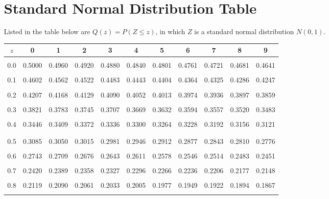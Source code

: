 \documentclass{report}
\begin{document}
\appendix

\chapter{Standard Normal Distribution Table}

Listed in the table below are $Q(z) = P(Z \leq z)$, in which $Z$ is a standard
normal distribution $N(0, 1)$.

\begin{center}
  \begin{tabular*}{\linewidth}{@{\extracolsep{\fill}} |c|c|ccc|ccc|ccc|}
    \hline
    $z$ & 0      & 1      & 2      & 3      & 4      & 5      & 6      & 7      & 8      & 9      \\
    \hline
    \\[-1em]
    0.0 & 0.5000 & 0.4960 & 0.4920 & 0.4880 & 0.4840 & 0.4801 & 0.4761 & 0.4721 & 0.4681 & 0.4641 \\
    \\[-1em]
    0.1 & 0.4602 & 0.4562 & 0.4522 & 0.4483 & 0.4443 & 0.4404 & 0.4364 & 0.4325 & 0.4286 & 0.4247 \\
    \\[-1em]
    0.2 & 0.4207 & 0.4168 & 0.4129 & 0.4090 & 0.4052 & 0.4013 & 0.3974 & 0.3936 & 0.3897 & 0.3859 \\
    \\[-1em]
    0.3 & 0.3821 & 0.3783 & 0.3745 & 0.3707 & 0.3669 & 0.3632 & 0.3594 & 0.3557 & 0.3520 & 0.3483 \\
    \\[-1em]
    0.4 & 0.3446 & 0.3409 & 0.3372 & 0.3336 & 0.3300 & 0.3264 & 0.3228 & 0.3192 & 0.3156 & 0.3121 \\
    \\[-1em]
    \hline
    \\[-1em]
    0.5 & 0.3085 & 0.3050 & 0.3015 & 0.2981 & 0.2946 & 0.2912 & 0.2877 & 0.2843 & 0.2810 & 0.2776 \\
    \\[-1em]
    0.6 & 0.2743 & 0.2709 & 0.2676 & 0.2643 & 0.2611 & 0.2578 & 0.2546 & 0.2514 & 0.2483 & 0.2451 \\
    \\[-1em]
    0.7 & 0.2420 & 0.2389 & 0.2358 & 0.2327 & 0.2296 & 0.2266 & 0.2236 & 0.2206 & 0.2177 & 0.2148 \\
    \\[-1em]
    0.8 & 0.2119 & 0.2090 & 0.2061 & 0.2033 & 0.2005 & 0.1977 & 0.1949 & 0.1922 & 0.1894 & 0.1867 \\
    \\[-1em]

\end{tabular*}
\end{center}
\end{document}
